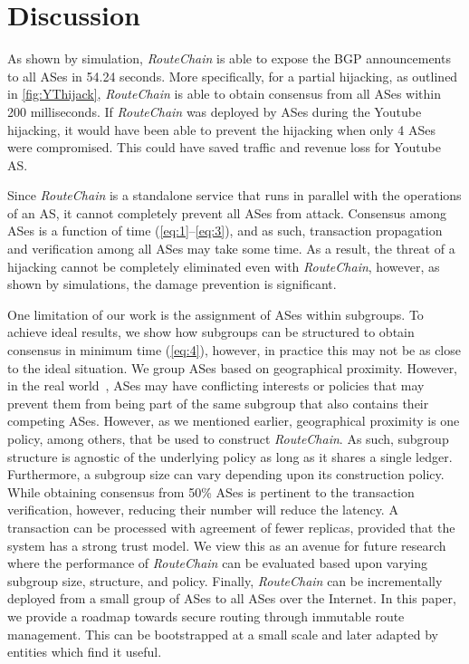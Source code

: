 \documentclass[conference]{IEEEtran}
\newcommand{\rc}{{{\em RouteChain}}\xspace}
\begin{document}
\section{Discussion}\label{sec:discussion}
As shown by simulation, \rc is able to expose the BGP announcements to all ASes in 54.24 seconds. More specifically, for a partial hijacking, as outlined in \autoref{fig:YThijack}, \rc is able to obtain consensus from all ASes within 200 milliseconds. If \rc was deployed by ASes during the Youtube hijacking, it would have been able to prevent the hijacking when only 4 ASes were compromised. This could have saved traffic and revenue loss for Youtube AS. 

Since \rc is a standalone service that runs in parallel with the operations of an AS, it cannot completely prevent all ASes from attack. Consensus among ASes is a function of time (\autoref{eq:1}--\autoref{eq:3}), and as such, transaction propagation and verification among all ASes may take some time. As a result, the threat of a hijacking cannot be completely eliminated even with \rc, however, as shown by simulations, the damage prevention is significant.

One limitation of our work is the assignment of ASes within subgroups. To achieve ideal results, we show how subgroups can be structured to obtain consensus in minimum time (\autoref{eq:4}), however, in practice this may not be as close to the ideal situation. We group ASes based on geographical proximity. However, in the real world~\cite{LiangBXH11}, ASes may have conflicting interests or policies that may prevent them from being part of the same subgroup that also contains their competing ASes. However, as we mentioned earlier, geographical proximity is one policy, among others, that be used to construct \rc. As such, subgroup structure is agnostic of the underlying policy as long as it shares a single ledger. Furthermore, a subgroup size can vary depending upon its construction policy. While obtaining consensus from 50\% ASes is pertinent to the transaction verification, however, reducing their number will reduce the latency. A transaction can be processed with agreement of fewer replicas, provided that the system has a strong trust model. We view this as an avenue for future research where the performance of \rc can be evaluated based upon varying subgroup size, structure, and policy. Finally, \rc can be incrementally deployed from a small group of ASes to all ASes over the Internet. In this paper, we provide a roadmap towards secure routing through immutable route management. This can be bootstrapped at a small scale and later adapted by entities which find it useful. 
\end{document}
